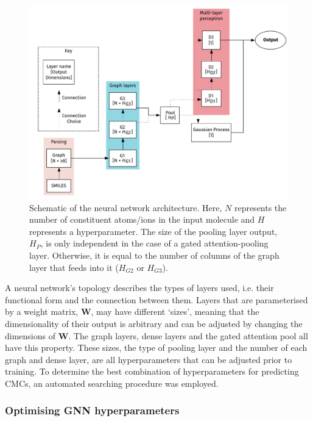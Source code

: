 \begin{figure}
    \centering
    \includegraphics[width=\textwidth]{images/model_graph.pdf}
    \caption{Schematic of the neural network architecture. Here, $N$ represents
        the number of constituent atoms/ions in the input molecule and $H$
        represents a hyperparameter. The size of the pooling layer output, $H_P$, is
        only independent in the case of a gated attention-pooling layer. Otherwise,
        it is equal to the number of columns of the graph layer that feeds into it
        ($H_{G2}$ or $H_{G3}$).}
    \label{fig:model-topology}
\end{figure}

A neural network's topology describes the types of layers used, i.e. their functional form and the connection between them. Layers that are parameterised by a weight matrix, $\mathbf{W}$, may have different `sizes', meaning that the
dimensionality of their output is arbitrary and can be adjusted by changing the dimensions of $\mathbf{W}$. The graph layers, dense layers and the gated attention pool all have this property. These sizes, the type of pooling layer
and the number of each graph and dense layer, are all hyperparameters that can be adjusted prior to training. To determine the best combination of hyperparameters for predicting CMCs, an automated searching procedure was
employed.

\subsubsection{Optimising GNN hyperparameters}

